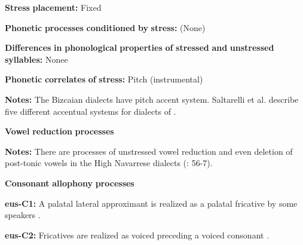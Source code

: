 \begin{styleBody}
\textbf{Stress} \textbf{placement:} Fixed
\end{styleBody}

\begin{styleBody}
\textbf{Phonetic} \textbf{processes} \textbf{conditioned} \textbf{by} \textbf{stress:} (None)
\end{styleBody}

\begin{styleBody}
\textbf{Differences} \textbf{in} \textbf{phonological} \textbf{properties} \textbf{of} \textbf{stressed} \textbf{and} \textbf{unstressed} \textbf{syllables:} Nonee
\end{styleBody}

\begin{styleBody}
\textbf{Phonetic} \textbf{correlates} \textbf{of} \textbf{stress:} Pitch (instrumental)
\end{styleBody}

\begin{styleBody}
\textbf{Notes:} The Bizcaian dialects have pitch accent system. Saltarelli et al. describe five different accentual systems for dialects of \citet[282-3]{Basque1988}.
\end{styleBody}

\begin{styleBody}
\textbf{Vowel} \textbf{reduction} \textbf{processes}
\end{styleBody}

\begin{styleBody}
\textbf{Notes:} There are processes of unstressed vowel reduction and even deletion of post-tonic vowels in the High Navarrese dialects (\citealt{HualdeUrbina2003}: 56-7).
\end{styleBody}

\begin{styleBody}
\textbf{Consonant} \textbf{allophony} \textbf{processes}
\end{styleBody}

\begin{styleBody}
\textbf{eus-C1:} A palatal lateral approximant is realized as a palatal fricative by some speakers \citep[29]{Hualde2003}.
\end{styleBody}

\begin{styleBody}
\textbf{eus-C2:} Fricatives are realized as voiced preceding a voiced consonant \citep[24]{Hualde2003}.
\end{styleBody}

